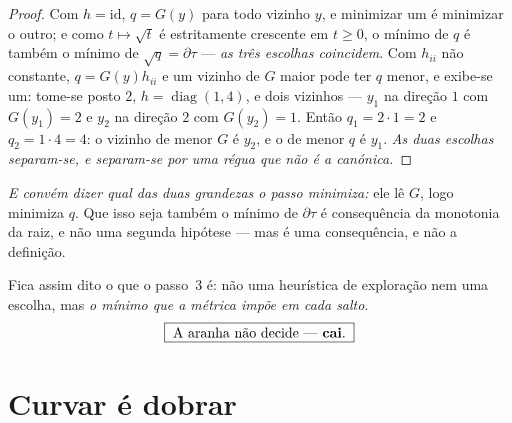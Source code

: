 \documentclass[livro.tex]{subfiles}
\begin{document}
\begin{proof}
Com $h=\mathrm{id}$, $q=G(y)$ para todo vizinho $y$, e minimizar um é minimizar o
outro; e como $t\mapsto\sqrt t$ é estritamente crescente em $t\ge0$, o mínimo de
$q$ é também o mínimo de $\sqrt q=\partial\tau$ --- \emph{as três escolhas
coincidem}. Com $h_{ii}$ não constante, $q=G(y)h_{ii}$ e um vizinho de $G$ maior
pode ter $q$ menor, e exibe-se um: tome-se posto $2$,
$h=\operatorname{diag}(1,4)$, e dois vizinhos --- $y_1$ na direção $1$ com
$G(y_1)=2$ e $y_2$ na direção $2$ com $G(y_2)=1$. Então $q_1=2\cdot1=2$ e
$q_2=1\cdot4=4$: o vizinho de menor $G$ é $y_2$, e o de menor $q$ é $y_1$.
\emph{As duas escolhas separam-se, e separam-se por uma régua que não é a
canónica.}\end{proof}

\medskip\noindent\emph{E convém dizer qual das duas grandezas o passo minimiza:}
ele lê $G$, logo minimiza $q$. Que isso seja também o mínimo de $\partial\tau$ é
consequência da monotonia da raiz, e não uma segunda hipótese --- mas é uma
consequência, e não a definição.

\medskip\noindent Fica assim dito o que o passo~3 é: não uma heurística de
exploração nem uma escolha, mas \emph{o mínimo que a métrica impõe em cada
salto}.
\[
\boxed{\;\text{A aranha não decide --- \textbf{cai}.}\;}
\]


\section{Curvar é dobrar}\label{fis:grav-curvatura}
\end{document}
